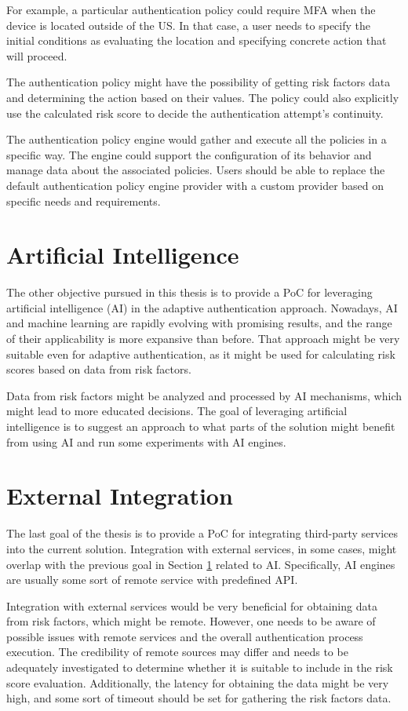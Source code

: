 For example, a particular authentication policy could require MFA when the device is located outside of the US.
In that case, a user needs to specify the initial conditions as evaluating the location and specifying concrete action that will proceed.

The authentication policy might have the possibility of getting risk factors data and determining the action based on their values.
The policy could also explicitly use the calculated risk score to decide the authentication attempt's continuity.

The authentication policy engine would gather and execute all the policies in a specific way.
The engine could support the configuration of its behavior and manage data about the associated policies.
Users should be able to replace the default authentication policy engine provider with a custom provider based on specific needs and requirements.

\section{Artificial Intelligence}\label{spec-ai}
The other objective pursued in this thesis is to provide a PoC for leveraging artificial intelligence (AI) in the adaptive authentication approach.
Nowadays, AI and machine learning are rapidly evolving with promising results, and the range of their applicability is more expansive than before.
That approach might be very suitable even for adaptive authentication, as it might be used for calculating risk scores based on data from risk factors.

Data from risk factors might be analyzed and processed by AI mechanisms, which might lead to more educated decisions.
The goal of leveraging artificial intelligence is to suggest an approach to what parts of the solution might benefit from using AI and run some experiments with AI engines.

\section{External Integration} \label{spec-external-integration}
The last goal of the thesis is to provide a PoC for integrating third-party services into the current solution.
Integration with external services, in some cases, might overlap with the previous goal in Section \ref{spec-ai} related to AI.
Specifically, AI engines are usually some sort of remote service with predefined API. 

Integration with external services would be very beneficial for obtaining data from risk factors, which might be remote.
However, one needs to be aware of possible issues with remote services and the overall authentication process execution.
The credibility of remote sources may differ and needs to be adequately investigated to determine whether it is suitable to include in the risk score evaluation.
Additionally, the latency for obtaining the data might be very high, and some sort of timeout should be set for gathering the risk factors data.

